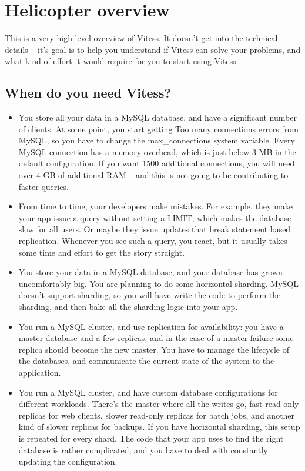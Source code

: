 \section{Helicopter overview}\label{Helicopter-Overview}

This is a very high level overview of Vitess. It doesn’t get into the technical
details – it’s goal is to help you understand if Vitess can solve your problems,
and what kind of effort it would require for you to start using Vitess.

\subsection{When do you need Vitess?}\hypertarget{when-do-you-need-vitess}{}\label{when-do-you-need-vitess}

\begin{itemize}
\item You store all your data in a MySQL database, and have a significant number of
  clients. At some point, you start getting Too many connections errors from
  MySQL, so you have to change the max\_connections system variable. Every MySQL
  connection has a memory overhead, which is just below 3 MB in the default
  configuration. If you want 1500 additional connections, you will need over 4 GB
  of additional RAM – and this is not going to be contributing to faster queries.
\item From time to time, your developers make mistakes. For example, they make your
  app issue a query without setting a LIMIT, which makes the database slow for
  all users. Or maybe they issue updates that break statement based replication.
  Whenever you see such a query, you react, but it usually takes some time and
  effort to get the story straight.
\item You store your data in a MySQL database, and your database has grown
  uncomfortably big. You are planning to do some horizontal sharding. MySQL
  doesn’t support sharding, so you will have write the code to perform the
  sharding, and then bake all the sharding logic into your app.
\item You run a MySQL cluster, and use replication for availability: you have a master
  database and a few replicas, and in the case of a master failure some replica
  should become the new master. You have to manage the lifecycle of the databases,
  and communicate the current state of the system to the application.
\item You run a MySQL cluster, and have custom database configurations for different
  workloads. There’s the master where all the writes go, fast read-only replicas
  for web clients, slower read-only replicas for batch jobs, and another kind of
  slower replicas for backups. If you have horizontal sharding, this setup is
  repeated for every shard. The code that your app uses to find the right
  database is rather complicated, and you have to deal with constantly updating
  the configuration.
\end{itemize}

